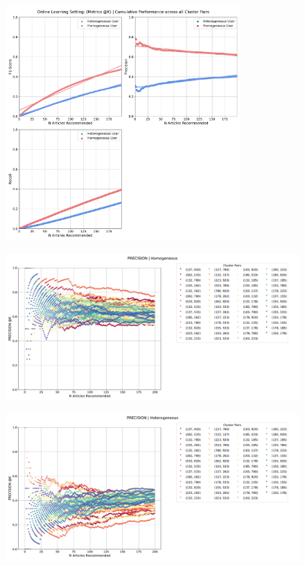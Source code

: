 \documentclass[a4paper,fontsize=9.0pt]{scrartcl}
\begin{document}
\vspace{1ex}
\begin{figure}[H]
 \includegraphics[width=0.8\textwidth]{Graphs/user_interaction_vs_model_performance_cumu.pdf}
\end{figure}
\vspace{-4ex}
\begin{figure}[H]
 \includegraphics[width=1.0\textwidth]{Graphs/user_interaction_vs_model_performance_precision_all_cps_Homogeneous.pdf}
\end{figure}
\begin{figure}[H]
 \includegraphics[width=1.0\textwidth]{Graphs/user_interaction_vs_model_performance_precision_all_cps_Heterogeneous.pdf}
\end{figure}
\end{document}
